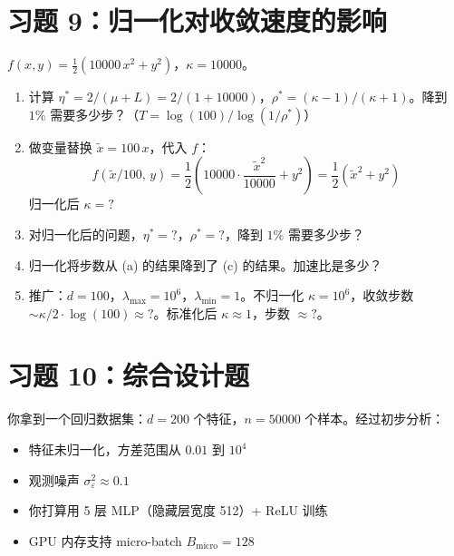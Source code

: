 \documentclass[12pt, a4paper]{ctexart}
\begin{document}
\section*{习题 9：归一化对收敛速度的影响}

$f(x,y) = \frac{1}{2}(10000\,x^2 + y^2)$，$\kappa = 10000$。

\begin{enumerate}
    \item[(a)] 计算 $\eta^* = 2/(\mu+L) = 2/(1+10000)$，$\rho^* = (\kappa-1)/(\kappa+1)$。降到 $1\%$ 需要多少步？（$T = \log(100)/\log(1/\rho^*)$）
    
    \item[(b)] 做变量替换 $\tilde{x} = 100\,x$，代入 $f$：
    \[
    f(\tilde{x}/100,\, y) = \frac{1}{2}\left(10000 \cdot \frac{\tilde{x}^2}{10000} + y^2\right) = \frac{1}{2}(\tilde{x}^2 + y^2)
    \]
    归一化后 $\kappa = ?$
    
    \item[(c)] 对归一化后的问题，$\eta^* = ?$，$\rho^* = ?$，降到 $1\%$ 需要多少步？
    
    \item[(d)] 归一化将步数从 (a) 的结果降到了 (c) 的结果。加速比是多少？
    
    \item[(e)] 推广：$d = 100$，$\lambda_{\max} = 10^6$，$\lambda_{\min} = 1$。不归一化 $\kappa = 10^6$，收敛步数 $\sim \kappa/2 \cdot \log(100) \approx ?$。标准化后 $\kappa \approx 1$，步数 $\approx ?$。
\end{enumerate}


\section*{习题 10：综合设计题}

你拿到一个回归数据集：$d = 200$ 个特征，$n = 50000$ 个样本。经过初步分析：
\begin{itemize}
    \item 特征未归一化，方差范围从 $0.01$ 到 $10^4$
    \item 观测噪声 $\sigma_\varepsilon^2 \approx 0.1$
    \item 你打算用 5 层 MLP（隐藏层宽度 512）+ ReLU 训练
    \item GPU 内存支持 micro-batch $B_{\text{micro}} = 128$
\end{itemize}
\end{document}
